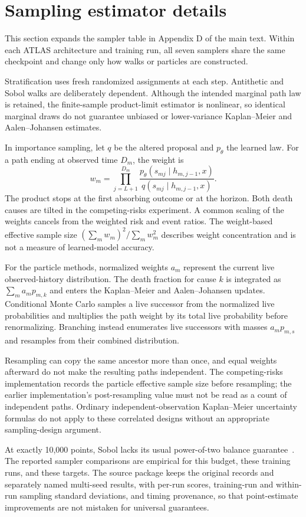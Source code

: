 \section{Sampling estimator details}\label{supp:samplers}
This section expands the sampler table in Appendix D of the main text. Within each ATLAS architecture and training run, all seven samplers share the same checkpoint and change only how walks or particles are constructed.

Stratification uses fresh randomized assignments at each step. Antithetic and Sobol walks are deliberately dependent. Although the intended marginal path law is retained, the finite-sample product-limit estimator is nonlinear, so identical marginal draws do not guarantee unbiased or lower-variance Kaplan--Meier and Aalen--Johansen estimates.

In importance sampling, let $q$ be the altered proposal and $p_\theta$ the learned law. For a path ending at observed time $D_m$, the weight is
\[
w_m=\prod_{j=L+1}^{D_m}\frac{p_\theta(s_{mj}\mid h_{m,j-1},x)}{q(s_{mj}\mid h_{m,j-1},x)}.
\]
The product stops at the first absorbing outcome or at the horizon. Both death causes are tilted in the competing-risks experiment. A common scaling of the weights cancels from the weighted risk and event ratios. The weight-based effective sample size $(\sum_mw_m)^2/\sum_mw_m^2$ describes weight concentration and is not a measure of learned-model accuracy.

For the particle methods, normalized weights $a_m$ represent the current live observed-history distribution. The death fraction for cause $k$ is integrated as $\sum_ma_mp_{m,k}$ and enters the Kaplan--Meier and Aalen--Johansen updates. Conditional Monte Carlo samples a live successor from the normalized live probabilities and multiplies the path weight by its total live probability before renormalizing. Branching instead enumerates live successors with masses $a_mp_{m,s}$ and resamples from their combined distribution.

Resampling can copy the same ancestor more than once, and equal weights afterward do not make the resulting paths independent. The competing-risks implementation records the particle effective sample size before resampling; the earlier implementation's post-resampling value must not be read as a count of independent paths. Ordinary independent-observation Kaplan--Meier uncertainty formulas do not apply to these correlated designs without an appropriate sampling-design argument.

At exactly 10,000 points, Sobol lacks its usual power-of-two balance guarantee~\citep{owen1998,owen2013}. The reported sampler comparisons are empirical for this budget, these training runs, and these targets. The source package keeps the original records and separately named multi-seed results, with per-run scores, training-run and within-run sampling standard deviations, and timing provenance, so that point-estimate improvements are not mistaken for universal guarantees.
